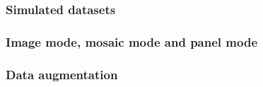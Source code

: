 \subsubsection{Simulated datasets}


\subsubsection{Image mode, mosaic mode and panel mode}


\subsubsection{Data augmentation}
